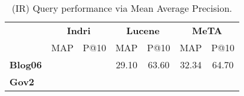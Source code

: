 \begin{table}[t]
\centering
{\small
\begin{tabular}{|l|cc|cc|cc|}
    \hline &
    \multicolumn{2}{c|}{\textbf{Indri}} &
    \multicolumn{2}{c|}{\textbf{Lucene}} &
    \multicolumn{2}{c|}{\textbf{MeTA}} \\
    & MAP & P@10 & MAP & P@10 & MAP & P@10\\
    \hline
    \textbf{Blog06} & & & 29.10 & 63.60 & 32.34 & 64.70 \\
    \textbf{Gov2} & & & & & & \\
    \hline
\end{tabular}
\caption{(IR) Query performance via Mean Average Precision.}
\label{table:ir-map}
}
\end{table}
